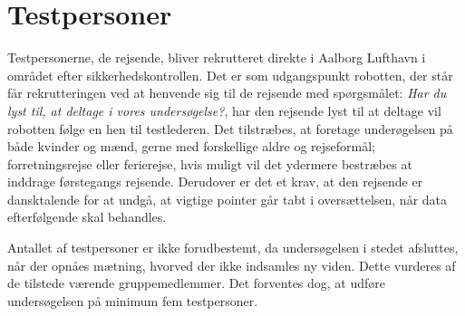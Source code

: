\section{Testpersoner}
\label{ParametreTestpersoner}
%
Testpersonerne, de rejsende, bliver rekrutteret direkte i Aalborg Lufthavn i området efter sikkerhedskontrollen. Det er som udgangspunkt robotten, der står får rekrutteringen ved at henvende sig til de rejsende med spørgsmålet: \textit{Har du lyst til, at deltage i vores undersøgelse?}, har den rejsende lyst til at deltage vil robotten følge en hen til testlederen.\blankline 
%
Det tilstræbes, at foretage underøgelsen på både kvinder og mænd, gerne med forskellige aldre og rejseformål; forretningsrejse eller ferierejse, hvis muligt vil det ydermere bestræbes at inddrage førstegangs rejsende. Derudover er det et krav, at den rejsende er dansktalende for at undgå, at vigtige pointer går tabt i oversættelsen, når data efterfølgende skal behandles. 

Antallet af testpersoner er ikke forudbestemt, da undersøgelsen i stedet afsluttes, når der opnåes mætning, hvorved der ikke indsamles ny viden. Dette vurderes af de tilstede værende gruppemedlemmer. Det forventes dog, at udføre undersøgelsen på minimum fem testpersoner.     
